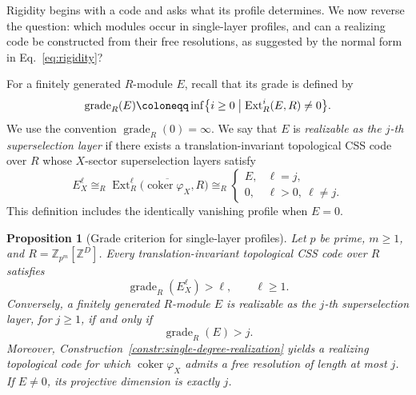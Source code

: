 \documentclass[aps,prx,english,superscriptaddress,twocolumn,tightenlines,showpacs,longbibliography,floatfix,amsfonts]{revtex4-2}
\newtheorem{proposition}{Proposition}
\theoremstyle{remark}
\theoremstyle{definition}
\begin{document}
Rigidity begins with a code and asks what its profile determines. We now
reverse the question: which modules occur in single-layer profiles, and
can a realizing code be constructed from their free resolutions, as
suggested by the normal form in Eq.~\eqref{eq:rigidity}?

For a finitely generated \(R\)-module \(E\), recall that its grade is defined
by~\cite[Prop.~18.4]{eisenbud1995commutative}
\begin{equation}
	\operatorname{grade}_R(E)
	\coloneqq
	\inf\bigl\{i\geq0\bigm|
	\operatorname{Ext}_R^i(E,R)\neq0\bigr\}.
	\label{eq:module-grade}
\end{equation}
We use the convention \(\operatorname{grade}_R(0)=\infty\). We say that
\(E\) is \emph{realizable as the \(j\)-th superselection layer} if there exists a
translation-invariant topological CSS code over \(R\) whose \(X\)-sector
superselection layers satisfy
	\begin{equation}
	E_X^\ell
	\cong_R
	\operatorname{Ext}_R^\ell
	\bigl(\overline{\operatorname{coker}\varphi_X},R\bigr)
	\cong_R
	\begin{cases}
		E, & \ell=j,\\
		0, & \ell>0,\ \ell\neq j.
	\end{cases}
	\label{eq:realized-profile}
\end{equation}
This definition includes the identically vanishing profile when \(E=0\).

\begin{proposition}[Grade criterion for single-layer profiles]
	\label{prop:single-degree-realizability}
	Let \(p\) be prime, \(m\geq1\), and
	\(R=\mathbb Z_{p^m}[\mathbb Z^D]\). Every translation-invariant
	topological CSS code over \(R\) satisfies
	\begin{equation}
		\operatorname{grade}_R(E_X^\ell)>\ell,
		\qquad \ell\geq1.
		\label{eq:topological-grade-bound}
	\end{equation}
	Conversely, a finitely generated \(R\)-module \(E\) is realizable as the
	\(j\)-th superselection layer, for \(j\geq1\), if and only if
	\begin{equation}
		\operatorname{grade}_R(E)>j.
		\label{eq:realizability-grade}
	\end{equation}
	Moreover, Construction~\ref{constr:single-degree-realization} yields a
	realizing topological code for which
	\(\operatorname{coker}\varphi_X\) admits a free resolution of length at
	most \(j\). If \(E\neq0\), its projective dimension is exactly \(j\).
\end{proposition}
\end{document}
